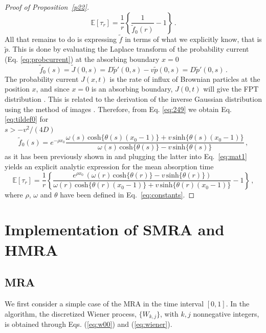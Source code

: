\documentclass[preprint,12pt]{elsarticle}
\numberwithin{equation}{section}
\theoremstyle{plain} \newtheorem{theorem}{Theorem}[section]
\theoremstyle{plain} \newtheorem{proposition}[theorem]{Proposition}
\theoremstyle{plain} \newtheorem{lemma}[theorem]{Lemma}
\theoremstyle{plain} \newtheorem{corollary}[theorem]{Corollary}
\theoremstyle{definition} \newtheorem{definition}[theorem]{Definition}
\theoremstyle{definition} \newtheorem{notation}[theorem]{Notation}
\theoremstyle{remark} \newtheorem{remark}[theorem]{Remark}
\theoremstyle{remark} \newtheorem{remarks}[theorem]{Remarks}
\theoremstyle{remark} \newtheorem{algorithm2}[theorem]{Algorithm}
\theoremstyle{remark} \newtheorem{example}[theorem]{Example}
\newcommand{\E}{\mathbb{E}}
\begin{document}
\begin{appendices}
\begin{proof}[Proof of Proposition~\ref{p22}]
\begin{equation}
\label{eq:mat1}
	\E [\tau_r] =\frac{1}{r}\left\{\frac{1}{\tilde{f}_0(r)}-1\right\}\,.
\end{equation}
All that remains to do is expressing $\tilde{f}$ in terms of
what we explicitly know, that is $\tilde{p}$. This is done by evaluating the Laplace transform of the probability current (Eq. \eqref{eq:probcurrent}) at the absorbing boundary $x=0$
\begin{equation}
	\tilde{f}_0(s) = \tilde{J}(0,s) = 
     D \tilde{p}'(0,s) - v \tilde{p}(0,s)
    = D \tilde{p}'(0,s) \, .
    \label{eq:249}
\end{equation}
The probability current $J(x,t)$ is the rate of influx of Brownian particles at the position $x$, and since $x=0$ is an absorbing boundary, $J(0,t)$ will give the FPT distribution \cite{redner2001guide}. This is related to the derivation of the inverse Gaussian distribution using the method of images \cite{Whitmore1987, Chhikara1988-nr}.
Therefore, from Eq. \eqref{eq:249} we obtain Eq. \eqref{eq:tildef0} for \\ $s>- v^2/(4D)$
\begin{equation}
    \tilde{f}_0(s)=
	e^{-\rho x_0}\frac{\omega(s) \, \mathrm{cosh}\{\theta(s)(x_0-1)\}+v \, \mathrm{sinh}\{\theta(s)(x_0-1)\}}
	{\omega(s) \, \mathrm{cosh}\{\theta(s)\}-v \, \mathrm{sinh}\{\theta(s)\}}\,,
\end{equation}
as it has been previously shown in \cite{Godec2016} and plugging the latter into Eq.~\eqref{eq:mat1} yields an explicit analytic expression for the mean absorption time
\begin{equation*}
	\mathbb{E}[\tau_r]
	=\frac{1}{r}\left\{\frac{e^{\rho x_0} \, (\omega(r) \, \mathrm{cosh}\{\theta(r)\}-v \,\mathrm{sinh}\{\theta(r)\})}{\omega(r) \, \mathrm{cosh}\{\theta(r)(x_0-1)\}+v \, \mathrm{sinh}\{\theta(r)(x_0-1)\}}-1\right\}\,,
\end{equation*} 
where $\rho$, $\omega$ and $\theta$ have been defined in Eq.~\eqref{eq:constants}.
\end{proof}

\newpage

\section{Implementation of SMRA and HMRA}\label{ap:mra}

\subsection{MRA}\label{AP:multiresolution_algorithm}
We first consider a simple case of the MRA in the time interval $[0,1]$. In the algorithm, the discretized Wiener process, $\{ W_{k,j} \}$, with $k,j$ nonnegative integers,
is obtained through Eqs. (\ref{eq:w00}) and
(\ref{eq:wiener}). 


\end{appendices}
\end{document}

